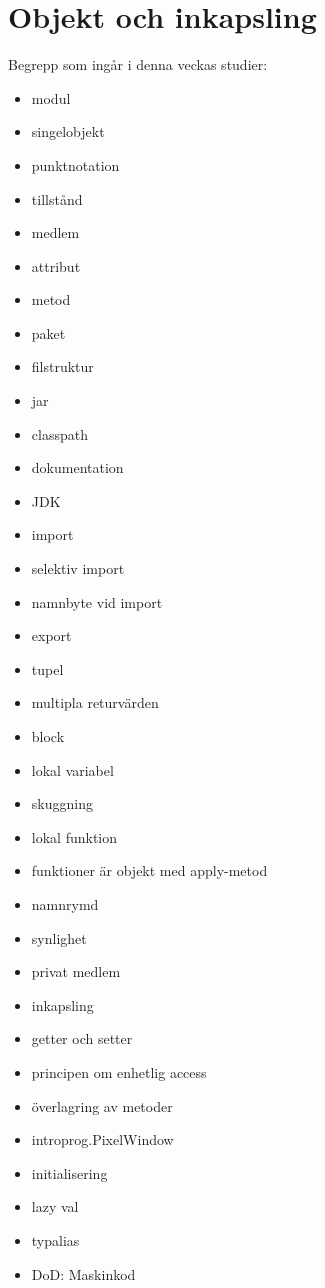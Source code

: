 \chapter{Objekt och inkapsling}\label{chapter:W04}
Begrepp som ingår i denna veckas studier:
\begin{multicols}{2}\begin{itemize}[noitemsep,label={$\square$},leftmargin=*]
\item modul
\item singelobjekt
\item punktnotation
\item tillstånd
\item medlem
\item attribut
\item metod
\item paket
\item filstruktur
\item jar
\item classpath
\item dokumentation
\item JDK
\item import
\item selektiv import
\item namnbyte vid import
\item export
\item tupel
\item multipla returvärden
\item block
\item lokal variabel
\item skuggning
\item lokal funktion
\item funktioner är objekt med apply-metod
\item namnrymd
\item synlighet
\item privat medlem
\item inkapsling
\item getter och setter
\item principen om enhetlig access
\item överlagring av metoder
\item introprog.PixelWindow
\item initialisering
\item lazy val
\item typalias
\item DoD: Maskinkod\end{itemize}\end{multicols}
